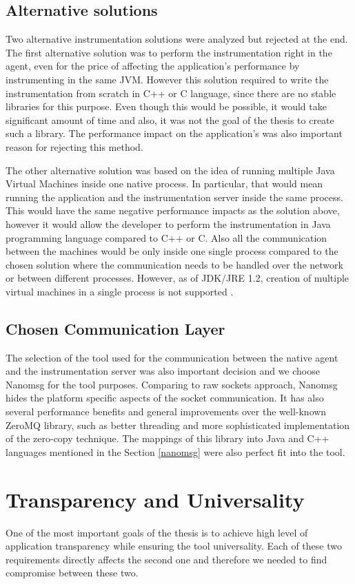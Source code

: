 \subsection{Alternative solutions}
Two alternative instrumentation solutions were analyzed but rejected at the end. The first alternative solution was to perform the instrumentation right in the agent, even for the price of affecting the application's performance by instrumenting in the same JVM. However this solution required to write the instrumentation from scratch in C++ or C language, since there are no stable libraries for this purpose. Even though this would be possible, it would take significant amount of time and also, it was not the goal of the thesis to create such a library. The performance impact on the application's was also important reason for rejecting this method.

The other alternative solution was based on the idea of running multiple Java Virtual Machines inside one native process. In particular, that would mean running the application and the instrumentation server inside the same process. This would have the same  negative performance impacts as the solution above, however it would allow the developer to perform the instrumentation in Java programming language compared to C++ or C. Also all the communication between the machines would be only inside one single process compared to the chosen solution where the communication needs to be handled over the network or between different processes. However, as of JDK/JRE 1.2, creation of multiple virtual machines in a single process is not supported \cite{MoreJVMOnceProccess}.
							
\subsection{Chosen Communication Layer}
The selection of the tool used for the communication between the native agent and the instrumentation server was also important decision and we choose Nanomsg for the tool purposes. Comparing to raw sockets approach, Nanomsg hides the platform specific aspects of the socket communication. It has also several performance benefits and general improvements over the well-known ZeroMQ library, such as better threading and more sophisticated implementation of the zero-copy technique. The mappings of this library into Java and C++ languages mentioned in the Section \ref{nanomsg} were also perfect fit into the tool.
		

\section{Transparency and Universality}
One of the most important goals of the thesis is to achieve high level of application transparency while ensuring the tool universality. Each of these two requirements directly affects the second one and therefore we needed to find compromise between these two.


